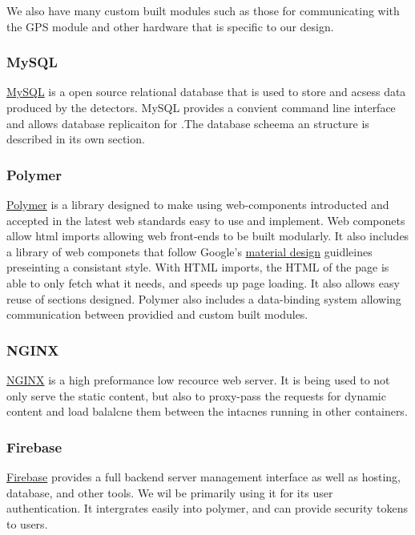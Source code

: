 We also have many custom built modules such as those for communicating with the GPS module and other hardware that is specific to our design.

\subsubsection{MySQL}
\href{https://www.mysql.com/}{MySQL} is a open source relational database that is used to store and acsess data produced by the detectors. MySQL provides a convient command line interface and allows database replicaiton for .The database scheema an structure is described in its own section.

\subsubsection{Polymer}
\href{https://www.polymer-project.org/1.0/}{Polymer} is a library designed to make using web-components introducted and accepted in the latest web standards easy to use and implement. Web componets allow html imports allowing web front-ends to be built modularly. It also includes a library of web componets that follow Google's \href{https://material.io/guidelines/}{material design} guidleines preseinting a consistant style. With HTML imports, the HTML of the page is able to only fetch what it needs, and speeds up page loading. It also allows easy reuse of sections designed. Polymer also includes a data-binding system allowing communication between providied and custom built modules.

\subsubsection{NGINX}
\href{https://www.nginx.com/resources/wiki/}{NGINX} is a high preformance low recource web server. It is being used to not only serve the static content, but also to proxy-pass the requests for dynamic content and load balalcne them between the intacnes running in other containers.

\subsubsection{Firebase}
\href{https://firebase.google.com/}{Firebase} provides a full backend server management interface as well as hosting, database, and other tools. We wil be primarily using it for its user authentication. It intergrates easily into polymer, and can provide security tokens to users.

